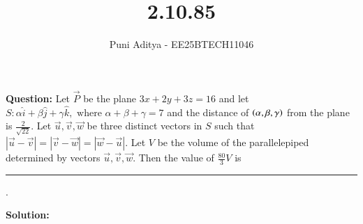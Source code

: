 \documentclass[xournal]{IEEEtran}
\begin{document}
\title{2.10.85}
\author{Puni Aditya - EE25BTECH11046}
\maketitle

\textbf{Question:}
Let $\vec{P}$ be the plane $3x + 2y + 3z = 16$ and let 
$S : \alpha \hat{i} + \beta \hat{j} + \gamma \hat{k},\text{ where } \alpha + \beta + \gamma = 7$
and the distance of $\left(\alpha, \beta, \gamma\right)$ from the plane is $\frac{2}{\sqrt{22}}$.
Let $\vec{u}, \vec{v}, \vec{w}$ be three distinct vectors in $S$ such that $|\vec{u} - \vec{v}| = |\vec{v} - \vec{w}| = |\vec{w} - \vec{u}|$. Let $V$ be the volume of the parallelepiped determined by vectors $\vec{u}, \vec{v}, \vec{w}$. Then the value of $\frac{80}{3} V$ is
\rule{1cm}{0.1pt}.

\textbf{Solution:}
\end{document}
